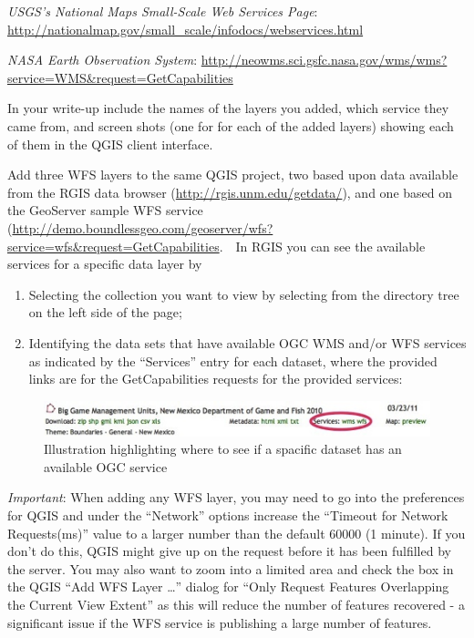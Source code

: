 \documentclass[]{book}
\begin{document}
\emph{USGS's National Maps \emph{Small-Scale Web Services} Page}:
\url{http://nationalmap.gov/small_scale/infodocs/webservices.html}

\emph{NASA Earth Observation System}:
\url{http://neowms.sci.gsfc.nasa.gov/wms/wms?service=WMS\&request=GetCapabilities}

In your write-up include the names of the layers you added, which
service they came from, and screen shots (one for for each of the added
layers) showing each of them in the QGIS client interface.

Add three WFS layers to the same QGIS project, two based upon data
available from the RGIS data browser
(\url{http://rgis.unm.edu/getdata/}), and one based on the GeoServer
sample WFS service
(\url{http://demo.boundlessgeo.com/geoserver/wfs?service=wfs\&request=GetCapabilities}.
  In RGIS you can see the available services for a specific data layer
by

\begin{enumerate}
\def\labelenumi{\arabic{enumi}.}
\item
  Selecting the collection you want to view by selecting from the
  directory tree on the left side of the page;
\item
  Identifying the data sets that have available OGC WMS and/or WFS
  services as indicated by the ``Services'' entry for each dataset,
  where the provided links are for the GetCapabilities requests for the
  provided services:
\end{enumerate}

\begin{figure}[htbp]
\centering
\includegraphics{images/RGIS_OGCLinkScreenshot.jpg}
\caption{Illustration highlighting where to see if a spacific dataset
has an available OGC service}
\end{figure}

\emph{Important}: When adding any WFS layer, you may need to go into the
preferences for QGIS and under the ``Network'' options increase the
``Timeout for Network Requests(ms)'' value to a larger number than the
default 60000 (1 minute). If you don't do this, QGIS might give up on
the request before it has been fulfilled by the server. You may also
want to zoom into a limited area and check the box in the QGIS ``Add WFS
Layer \ldots{}'' dialog for ``Only Request Features Overlapping the
Current View Extent'' as this will reduce the number of features
recovered - a significant issue if the WFS service is publishing a large
number of features.
\end{document}
